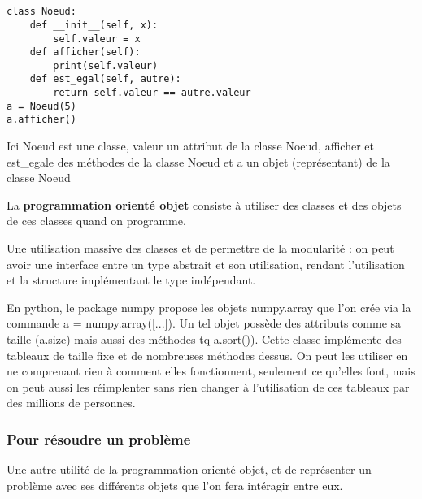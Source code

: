 \begin{example} \label{2-3}\enspace \\ \\
	\begin{minipage}{0.60 \linewidth}
		\begin{lstlisting}
class Noeud:
    def __init__(self, x):
        self.valeur = x
    def afficher(self):
        print(self.valeur)
    def est_egal(self, autre):
        return self.valeur == autre.valeur
a = Noeud(5)
a.afficher()
		\end{lstlisting}
	\end{minipage}\quad \begin{minipage}{0.35\linewidth}
		Ici Noeud est une classe, valeur un attribut de la classe Noeud, afficher et est\_egale des méthodes de la classe Noeud et a un objet (représentant) de la classe Noeud
	\end{minipage}
\end{example}

\begin{definition}
	La \textbf{programmation orienté objet} consiste à utiliser des classes et des objets de ces classes quand on programme.
\end{definition}

\begin{rem}
	Une utilisation massive des classes et de permettre de la modularité : on peut avoir une interface entre un type abstrait et son utilisation, rendant l'utilisation et la structure implémentant le type indépendant.
\end{rem}

\begin{example}
	En python, le package numpy propose les objets numpy.array que l’on crée via la commande
	a = numpy.array([...]). Un tel objet possède des attributs comme sa taille (a.size) mais aussi des
	méthodes tq a.sort()). Cette classe implémente des tableaux de taille fixe et de nombreuses méthodes dessus. On peut les utiliser en ne comprenant rien à comment elles fonctionnent, seulement ce qu'elles font, mais on peut aussi les réimplenter sans rien changer à l'utilisation de ces tableaux par des millions de personnes.
\end{example}

\subsubsection{Pour résoudre un problème}

Une autre utilité de la programmation orienté objet, et de représenter un problème avec ses différents objets que l'on fera intéragir entre eux.

